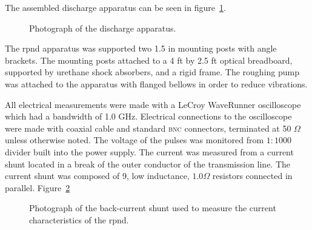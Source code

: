 The assembled discharge apparatus can be seen in figure~\ref{fig:appphoto}.
\begin{figure}
  \centering
  \setlength\fboxsep{0pt}
  \setlength\fboxrule{1.0pt}
  \caption{Photograph of the discharge apparatus.}
  \label{fig:appphoto}
\end{figure}
The \acs{rpnd} apparatus was supported two 1.5 in mounting posts with angle
brackets. The mounting posts attached to a 4 ft by 2.5 ft optical breadboard,
supported by urethane shock absorbers, and a rigid frame. The roughing pump was
attached to the apparatus with flanged bellows in order to reduce vibrations. 

All electrical measurements were made with a LeCroy  WaveRunner
oscilloscope which had a bandwidth of 1.0 GHz. Electrical connections to the
oscilloscope were made with  coaxial cable and standard
\textsc{bnc} connectors, terminated at 50 $\Omega$ unless otherwise noted. The
voltage of the pulses was monitored from $1:1000$ divider built into the power
supply. The current was measured from a current shunt located in a break of the
outer conductor of the transmission line. The current shunt was composed of 9,
low inductance, $1.0 \Omega$ resistors connected in parallel.
Figure~\ref{fig:bcs}
\begin{figure}
  \centering
  \setlength\fboxsep{0pt}
  \setlength\fboxrule{1.0pt}
  \caption{Photograph of the back-current shunt used to measure the current
  characteristics of the \acs{rpnd}.}
  \label{fig:bcs}
\end{figure}

